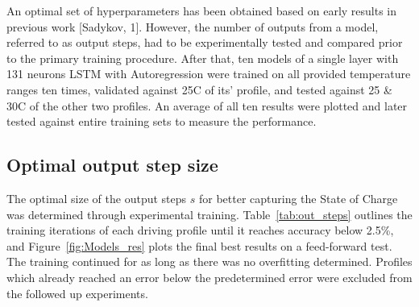  {
An optimal set of hyperparameters has been obtained based on early results in previous work [Sadykov, 1].
}
However, the number of outputs from a model, referred to as output steps, had to be experimentally tested and compared prior to the primary training procedure.
After that, ten models of a single layer with 131 neurons LSTM with Autoregression were trained on all provided temperature ranges ten times, validated against 25\textdegree{}C of its' profile, and tested against 25 \& 30\textdegree{}C of the other two profiles.
An average of all ten results were plotted and later tested against entire training sets to measure the performance.

\subsection{Optimal output step size}
    The optimal size of the output steps $s$ for better capturing the State of Charge was determined through experimental training.
    \mbox{Table~\ref{tab:out_steps}} outlines the training iterations of each driving profile until it reaches accuracy below 2.5\%, and Figure~\ref{fig:Models_res} plots the final best results on a feed-forward test.
    The training continued for as long as there was no overfitting determined.
    Profiles which already reached an error below the predetermined error were excluded from the followed up experiments.
